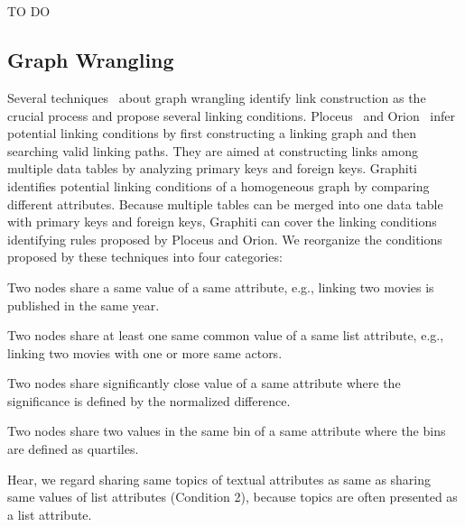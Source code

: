 \section{\ApproachName}
\colorbox{text-highlight}{TO DO}

\subsection{Graph Wrangling}
Several techniques~\cite{DBLP:journals/ivs/LiuNS14, DBLP:journals/ivs/HeerP14, DBLP:journals/tvcg/SrinivasanPEB18} about graph wrangling identify link construction as the crucial process and propose several linking conditions.
Ploceus~\cite{DBLP:journals/ivs/LiuNS14} and Orion~\cite{DBLP:journals/ivs/HeerP14} infer potential linking conditions by first constructing a linking graph and then searching valid linking paths. They are aimed at constructing links among multiple data tables by analyzing primary keys and foreign keys.
Graphiti~\cite{DBLP:journals/tvcg/SrinivasanPEB18} identifies potential linking conditions of a homogeneous graph by comparing different attributes.
Because multiple tables can be merged into one data table with primary keys and foreign keys, Graphiti can cover the linking conditions identifying rules proposed by Ploceus and Orion. %
We reorganize the conditions proposed by these techniques into four categories:
\begin{compactenum}
    \item Two nodes share a same value of a same attribute, e.g., linking two movies is published in the same year.
    \item Two nodes share at least one same common value of a same list attribute, e.g., linking two movies with one or more same actors.
    \item Two nodes share significantly close value of a same attribute where the significance is defined by the normalized difference.
    \item Two nodes share two values in the same bin of a same attribute where the bins are defined as quartiles.
\end{compactenum}
Hear, we regard sharing same topics of textual attributes as same as sharing same values of list attributes (Condition 2), because topics are often presented as a list attribute.

